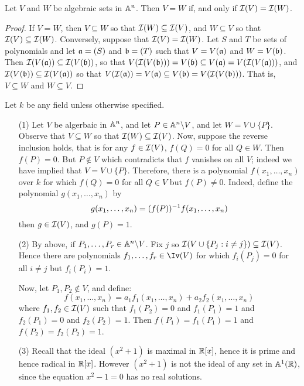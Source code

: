 \begin{proposition}
  Let $V$ and $W$ be algebraic sets in $\A^n$. Then $V=W$ if, and only
  if  $\Ic(V)=\Ic(W)$.
\end{proposition}
\begin{proof}
  If $V=W$, then  $V \subseteq W$ so that $\Ic(W) \subseteq \Ic(V)$,
  and $W \subseteq V$ so that $\Ic(V) \subseteq \Ic(W)$. Conversely,
  suppose that $\Ic(V)=\Ic(W)$. Let $S$ and $T$ be sets of
  polynomials and let $\af=(S)$ and $\bf=(T)$ such that
  $V=V(\af)$ and $W=V(\bf)$. Then $\Ic(V(\af)) \subseteq \Ic(V(\bf))$,
  so that $V(\Ic(V(\bf)))=V(\bf) \subseteq V(\af)=V(\Ic(V(\af)))$,
  and $\Ic(V(\bf)) \subseteq \Ic(V(\af))$ so that $V(\Ic(\af))=
  V(\af) \subseteq V(\bf)=V(\Ic(V(\bf)))$. That is, $V \subseteq W$
  and $W \subseteq V$.
\end{proof}

\begin{example}\label{example_10.4}
  Let $k$ be any field unless otherwise specified.
  \begin{enumerate}
    \item[(1)] Let $V$ be algerbaic in $\A^n$, and let $P \in
      \com{\A^n}{V}$, and let $W=V \cup \{P\}$. Observe that $V
      \subseteq W$ so that $\Ic(W) \subseteq \Ic(V)$. Now, suppose the
      reverse inclusion holds, that is for any $f \in \Ic(V)$,
      $f(Q)=0$ for all $Q \in W$. Then $f(P)=0$. But $P \notin V$
      which contradicts that $f$ vanishes on all $V$; indeed we have
      implied that $V=V \cup \{P\}$. Therefore, there is a polynomial
      $f(x_1, \dots, x_n)$ over $k$ for which $f(Q)=0$ for all $Q \in
      V$ but $f(P) \neq 0$. Indeed, define the polynomial $g(x_1,
      \dots, x_n)$ by
      \begin{equation*}
        g(x_1, \dots, x_n)=\inv{(f(P))}f(x_1, \dots, x_n)
      \end{equation*}
      then $g \in \Ic(V)$, and $g(P)=1$.

    \item[(2)] By above, if $P_1, \dots, P_r \in \com{\A^n}{V}$. Fix
      $j$ so $\Ic(V \cup \{P_j : i \neq j\}) \subseteq \Ic(V)$.
      Hence there are polynomials $f_1, \dots, f_r \in \Iv(V)$ for which
      $f_i(P_j)=0$ for all $i \neq j$ but $f_i(P_i)=1$.

      Now, let $P_1, P_2 \notin V$, and define:
      \begin{equation*}
        f(x_1, \dots, x_n)=a_1f_1(x_1, \dots, x_n)+a_2f_2(x_1, \dots,
        x_n)
      \end{equation*}
      where $f_1, f_2 \in \Ic(V)$ such that $f_1(P_2)=0$ and
      $f_1(P_1)=1$ and $f_2(P_1)=0$ and $f_2(P_2)=1$. Then
      $f(P_1)=f_1(P_1)=1$ and $f(P_2)=f_2(P_2)=1$.

    \item[(3)] Recall that the ideal $(x^2+1)$ is maximal in $\R[x]$,
      hence it is prime and hence radical in $\R[x]$. However
      $(x^2+1)$ is not the ideal of any set in $\A^1(\R)$, since the
      equation $x^2-1=0$ has no real solutions.
  \end{enumerate}
\end{example}

